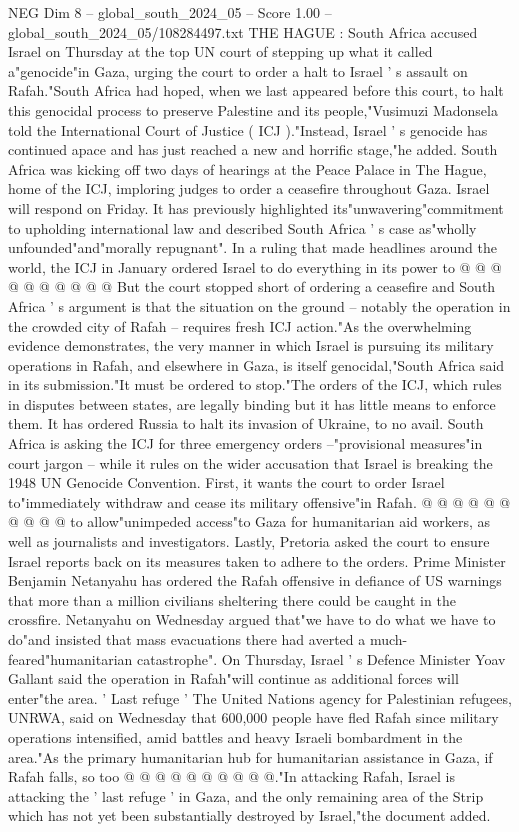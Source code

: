 \begin{textsample}{NEG Dim 8 – global\_south\_2024\_05 – Score 1.00 – global\_south\_2024\_05/108284497.txt}  \label{ex:f8_neg_237}
THE HAGUE : South Africa accused Israel on Thursday at the top UN court of stepping up what it called a"genocide"in Gaza, urging the court to order a halt to Israel ' s assault on Rafah."South Africa had hoped, when we last appeared before this court, to halt this genocidal process to preserve Palestine and its people,"Vusimuzi Madonsela told the International Court of Justice ( ICJ )."Instead, Israel ' s genocide has continued apace and has just reached a new and horrific stage,"he added.
South Africa was kicking off two days of hearings at the Peace Palace in The Hague, home of the ICJ, imploring judges to order a ceasefire throughout Gaza.
Israel will respond on Friday.
It has previously highlighted its"unwavering"commitment to upholding international law and described South Africa ' s case as"wholly unfounded"and"morally repugnant".
In a ruling that made headlines around the world, the ICJ in January ordered Israel to do everything in its power to @ @ @ @ @ @ @ @ @ @ But the court stopped short of ordering a ceasefire and South Africa ' s argument is that the situation on the ground -- notably the operation in the crowded city of Rafah -- requires fresh ICJ action."As the overwhelming evidence demonstrates, the very manner in which Israel is pursuing its military operations in Rafah, and elsewhere in Gaza, is itself genocidal,"South Africa said in its submission."It must be ordered to stop."The orders of the ICJ, which rules in disputes between states, are legally binding but it has little means to enforce them.
It has ordered Russia to halt its invasion of Ukraine, to no avail.
South Africa is asking the ICJ for three emergency orders --"provisional measures"in court jargon -- while it rules on the wider accusation that Israel is breaking the 1948 UN Genocide Convention.
First, it wants the court to order Israel to"immediately withdraw and cease its military offensive"in Rafah. @ @ @ @ @ @ @ @ @ @ to allow"unimpeded access"to Gaza for humanitarian aid workers, as well as journalists and investigators.
Lastly, Pretoria asked the court to ensure Israel reports back on its measures taken to adhere to the orders.
Prime Minister Benjamin Netanyahu has ordered the Rafah offensive in defiance of US warnings that more than a million civilians sheltering there could be caught in the crossfire.
Netanyahu on Wednesday argued that"we have to do what we have to do"and insisted that mass evacuations there had averted a much-feared"humanitarian catastrophe".
On Thursday, Israel ' s Defence Minister Yoav Gallant said the operation in Rafah"will continue as additional forces will enter"the area. ' Last refuge ' The United Nations agency for Palestinian refugees, UNRWA, said on Wednesday that 600,000 people have fled Rafah since military operations intensified, amid battles and heavy Israeli bombardment in the area."As the primary humanitarian hub for humanitarian assistance in Gaza, if Rafah falls, so too @ @ @ @ @ @ @ @ @ @."In attacking Rafah, Israel is attacking the ' last refuge ' in Gaza, and the only remaining area of the Strip which has not yet been substantially destroyed by Israel,"the document added.

\end{textsample}
